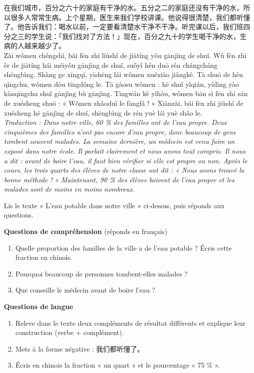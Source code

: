 \documentclass[11pt]{article}
\newcounter{popsec}
\newcounter{popsub}
\newcommand{\courssub}[1]{%
  \stepcounter{popsub}%
  \par\vspace{9pt}\noindent{\popxbold\fontsize{11.5}{13}\selectfont\color{popink}{\color{poporange}\thepopsec.\thepopsub}\hspace{6pt}#1}\par\nopagebreak\vspace{4pt}
}
\begin{document}
\courssub{Je me prépare au Bac}

\begin{textebox}
在我们城市，百分之六十的家庭有干净的水。五分之二的家庭还没有干净的水，所以很多人常常生病。上个星期，医生来我们学校讲课。他说得很清楚，我们都听懂了。他告诉我们：喝水以前，一定要看清楚水干净不干净。听完课以后，我们班四分之三的学生说：「我们找对了方法！」现在，百分之九十的学生喝干净的水，生病的人越来越少了。\\[4pt]
Zài wǒmen chéngshì, bǎi fēn zhī liùshí de jiātíng yǒu gānjìng de shuǐ. Wǔ fēn zhī èr de jiātíng hái méiyǒu gānjìng de shuǐ, suǒyǐ hěn duō rén chángcháng shēngbìng. Shàng ge xīngqī, yīshēng lái wǒmen xuéxiào jiǎngkè. Tā shuō de hěn qīngchu, wǒmen dōu tīngdǒng le. Tā gàosu wǒmen : hē shuǐ yǐqián, yídìng yào kànqīngchu shuǐ gānjìng bù gānjìng. Tīngwán kè yǐhòu, wǒmen bān sì fēn zhī sān de xuésheng shuō : « Wǒmen zhǎoduì le fāngfǎ ! » Xiànzài, bǎi fēn zhī jiǔshí de xuésheng hē gānjìng de shuǐ, shēngbìng de rén yuè lái yuè shǎo le.\\[4pt]
\emph{Traduction : Dans notre ville, 60 \% des familles ont de l'eau propre. Deux cinquièmes des familles n'ont pas encore d'eau propre, donc beaucoup de gens tombent souvent malades. La semaine dernière, un médecin est venu faire un exposé dans notre école. Il parlait clairement et nous avons tout compris. Il nous a dit : avant de boire l'eau, il faut bien vérifier si elle est propre ou non. Après le cours, les trois quarts des élèves de notre classe ont dit : « Nous avons trouvé la bonne méthode ! » Maintenant, 90 \% des élèves boivent de l'eau propre et les malades sont de moins en moins nombreux.}
\end{textebox}

\begin{exercice}
Lis le texte « L'eau potable dans notre ville » ci-dessus, puis réponds aux questions.

\textbf{Questions de compréhension} (réponds en français)
\begin{enumerate}
\item Quelle proportion des familles de la ville a de l'eau potable ? Écris cette fraction en chinois.
\item Pourquoi beaucoup de personnes tombent-elles malades ?
\item Que conseille le médecin avant de boire l'eau ?
\end{enumerate}

\textbf{Questions de langue}
\begin{enumerate}
\item Releve dans le texte deux compléments de résultat différents et explique leur construction (verbe + complément).
\item Mets à la forme négative : 我们都听懂了。
\item Écris en chinois la fraction « un quart » et le pourcentage « 75 \% ».
\end{enumerate}
\end{exercice}
\end{document}

